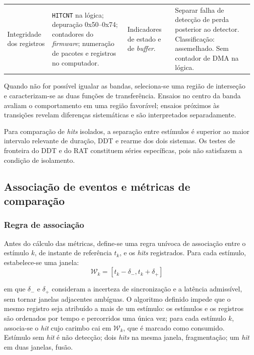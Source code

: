 \begin{longtable}{|
		>{\raggedright\arraybackslash}p{3.0cm}|
		>{\raggedright\arraybackslash}p{3.7cm}|
		>{\raggedright\arraybackslash}p{3.7cm}|
		>{\raggedright\arraybackslash}p{3.8cm}|}
	\hline
	Integridade dos registros & \texttt{HITCNT} na lógica; depuração 0x50--0x74; contadores do \textit{firmware}; numeração de pacotes e registros no computador. & Indicadores de estado e de \textit{buffer}. & Separar falha de detecção de perda posterior ao detector. Classificação: assemelhado. Sem contador de DMA na lógica. \\
\end{longtable}
\endgroup

Quando não for possível igualar as bandas, seleciona-se uma região de interseção e caracterizam-se as duas funções de transferência. Ensaios no centro da banda avaliam o comportamento em uma região favorável; ensaios próximos às transições revelam diferenças sistemáticas e são interpretados separadamente.

Para comparação de \textit{hits} isolados, a separação entre estímulos é superior ao maior intervalo relevante de duração, DDT e rearme dos dois sistemas. Os testes de fronteira do DDT e do RAT constituem séries específicas, pois não satisfazem a condição de isolamento.

\subsection{Associação de eventos e métricas de comparação}
\label{v2:subsec:metricas_comparacao}

\subsubsection{Regra de associação}
Antes do cálculo das métricas, define-se uma regra unívoca de associação entre o estímulo \(k\), de instante de referência \(t_k\), e os \textit{hits} registrados. Para cada estímulo, estabelece-se uma janela:
\begin{equation}
	\mathcal{W}_k = \left[t_k-\delta_-, t_k+\delta_+ \right]
	\label{v2:eq:janela_associacao_evento}
\end{equation}

\noindent
em que \(\delta_-\) e \(\delta_+\) consideram a incerteza de sincronização e a latência admissível, sem tornar janelas adjacentes ambíguas. O algoritmo definido impede que o mesmo registro seja atribuído a mais de um estímulo: os estímulos e os registros são ordenados por tempo e percorridos uma única vez; para cada estímulo \(k\), associa-se o \textit{hit} cujo carimbo cai em \(\mathcal{W}_k\), que é marcado como consumido. Estímulo sem \textit{hit} é não detecção; dois \textit{hits} na mesma janela, fragmentação; um \textit{hit} em duas janelas, fusão.


